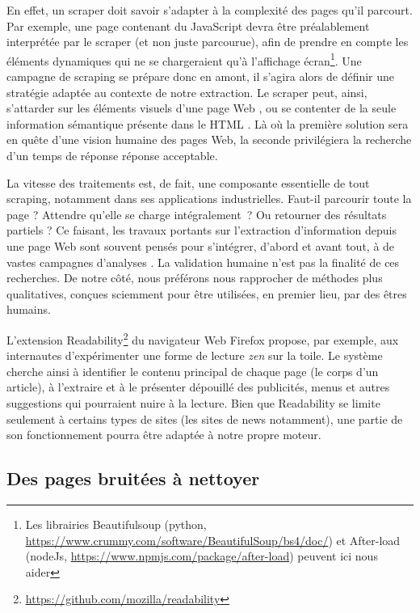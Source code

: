 \documentclass[symmetric,justified,marginals=raggedouter]{tufte-book}
\begin{document}
\noindent En effet, un scraper doit savoir s'adapter à la complexité des pages qu'il parcourt. Par exemple, une page contenant du JavaScript devra être préalablement interprétée par le scraper (et non juste parcourue), afin de prendre en compte les éléments dynamiques qui ne se chargeraient qu'à l'affichage écran\footnote{Les librairies Beautifulsoup (python, \url{https://www.crummy.com/software/BeautifulSoup/bs4/doc/}) et After-load (nodeJs, \url{https://www.npmjs.com/package/after-load}) peuvent ici nous aider}. Une campagne de scraping se prépare donc en amont, il s'agira alors de définir une stratégie adaptée au contexte de notre extraction. Le scraper peut, ainsi, s'attarder sur les éléments visuels d'une page Web \citep{cai_vips:_2003}, ou se contenter de la seule information sémantique présente dans le HTML \citep{jatowt_detecting_2007}. Là où la première solution sera en quête d'une vision humaine des pages Web, la seconde privilégiera la recherche d'un temps de réponse réponse acceptable. 

La vitesse des traitements est, de fait, une composante essentielle de tout scraping, notamment dans ses applications industrielles. Faut-il parcourir toute la page ? Attendre qu'elle se charge intégralement~? Ou retourner des résultats partiels ? Ce faisant, les travaux portants sur l'extraction d'information depuis une page Web sont souvent pensés pour s'intégrer, d'abord et avant tout, à de vastes campagnes d'a\-nalyses \citep{weninger_text_2008, adar_web_2009, oita_forest:_2015}. La validation humaine n'est pas la finalité de ces recherches. De notre côté, nous préférons nous rapprocher de méthodes plus qualitatives, conçues sciemment pour être utilisées, en premier lieu, par des êtres humains. 

L'extension Readability\footnote{\url{https://github.com/mozilla/readability}} du navigateur Web Firefox propose, par exemple, aux internautes d'expérimenter une forme de lecture \textit{zen} sur la toile. Le système cherche ainsi à identifier le contenu principal de chaque page (le corps d'un article), à l'extraire et à le présenter dépouillé des publicités, menus et autres suggestions qui pourraient nuire à la lecture. Bien que Readability se limite seulement à certains types de sites  (les sites de news notamment), une partie de son fonctionnement pourra être adaptée à notre propre moteur. 

\subsection{Des pages bruitées à nettoyer}
\end{document}
